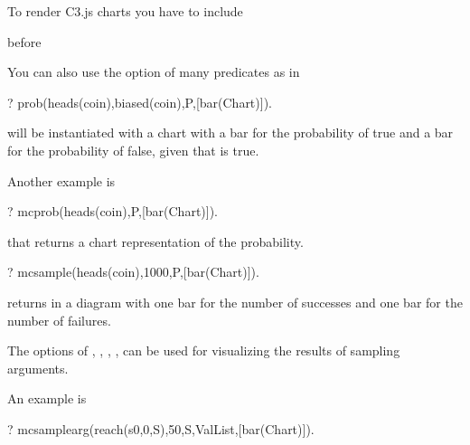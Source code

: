 \documentclass[letterpaper,10pt,english]{sphinxmanual}
\begin{document}
To render C3.js charts you have to include

\begin{sphinxVerbatim}[commandchars=\\\{\}]
 
\end{sphinxVerbatim}

before 

You can also use the  option of many predicates as in

\begin{sphinxVerbatim}[commandchars=\\\{\}]
?\PYGZhy{} prob(heads(coin),biased(coin),P,[bar(Chart)]).
\end{sphinxVerbatim}

 will be instantiated with a chart with a bar for the probability of  true and a bar for the probability of  false, given that  is true.

Another example is

\begin{sphinxVerbatim}[commandchars=\\\{\}]
?\PYGZhy{} mc\PYGZus{}prob(heads(coin),P,[bar(Chart)]).
\end{sphinxVerbatim}

that returns a chart representation of the probability.

\begin{sphinxVerbatim}[commandchars=\\\{\}]
?\PYGZhy{} mc\PYGZus{}sample(heads(coin),1000,P,[bar(Chart)]).
\end{sphinxVerbatim}

returns in  a diagram with one bar for the number of successes and one bar for the number of failures.

The options of , , , , can be used for visualizing the results of sampling arguments.

An example is

\begin{sphinxVerbatim}[commandchars=\\\{\}]
?\PYGZhy{} mc\PYGZus{}sample\PYGZus{}arg(reach(s0,0,S),50,S,ValList,[bar(Chart)]).
\end{sphinxVerbatim}
\end{document}
